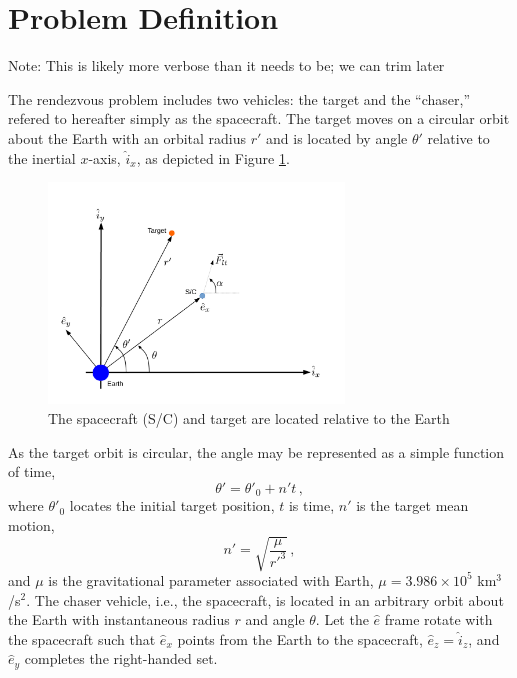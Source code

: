 \documentclass[conf]{new-aiaa}
\begin{document}
\section{Problem Definition}
{\color{blue} Note: This is likely more verbose than it needs to be; we can trim later}

The rendezvous problem includes two vehicles: the target and the ``chaser,'' refered to hereafter simply as the spacecraft. The target moves on a circular orbit about the Earth with an orbital radius $r'$ and is located by angle $\theta'$ relative to the inertial $x$-axis, $\hat{i}_x$, as depicted in Figure \ref{fig:frames}.
\begin{figure}[ht!]
	\centering
	\includegraphics[width=0.7\textwidth]{Frames.pdf}
	\caption{The spacecraft (S/C) and target are located relative to the Earth}
	\label{fig:frames}
\end{figure}
As the target orbit is circular, the angle may be represented as a simple function of time,
\begin{equation}
	\theta' = \theta'_0 + n't\,,
\end{equation}
where $\theta'_0$ locates the initial target position, $t$ is time, $n'$ is the target mean motion,
\begin{equation}
	n' = \sqrt{\frac{\mu}{r'^3}}\,,
\end{equation}
and $\mu$ is the gravitational parameter associated with Earth, $\mu = 3.986\times 10^5$ km$^3$/s$^2$. The chaser vehicle, i.e., the spacecraft, is located in an arbitrary orbit about the Earth with instantaneous radius $r$ and angle $\theta$. Let the $\hat{e}$ frame rotate with the spacecraft such that $\hat{e}_x$ points from the Earth to the spacecraft, $\hat{e}_z = \hat{i}_z$, and $\hat{e}_y$ completes the right-handed set.
\end{document}
